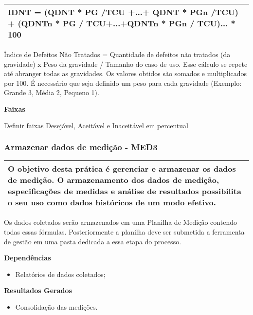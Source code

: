 \begin{table}[!ht]
\centering
\begin{tabular}{|p{130mm}|}
\hline
IDNT = (QDNT * PG /TCU +...+ QDNT * PGn /TCU) + (QDNTn * PG / TCU+...+QDNTn * PGn / TCU)... * 100 \\ 
\hline
\end{tabular}
\end{table}

Índice de Defeitos Não Tratados = Quantidade de defeitos não tratados (da gravidade) x Peso da gravidade / Tamanho do caso de uso. Esse cálculo se repete até abranger todas as gravidades. Os valores obtidos são somados e multiplicados por 100. É necessário que seja definido um peso para cada gravidade (Exemplo: Grande 3, Média 2, Pequeno 1).

\textbf{Faixas}

Definir faixas Desejável, Aceitável e Inaceitável em percentual

\subsubsection{Armazenar dados de medição - MED3 }
\label{sec:med3}

\begin{table}[!ht]
\centering
\begin{tabular}{|p{130mm}|}
\hline
O objetivo desta prática é gerenciar e armazenar os dados de medição. O armazenamento dos dados de medição, especificações de medidas e análise de resultados possibilita o seu uso como dados históricos de um modo efetivo. \\ 
\hline
\end{tabular}
\end{table}

Os dados coletados serão armazenados em uma Planilha de Medição contendo todas essas fórmulas. Posteriormente a planilha deve ser submetida a ferramenta de gestão em uma pasta dedicada a essa etapa do processo.

\textbf{Dependências}

\begin{itemize}
\item Relatórios de dados coletados;
\end{itemize}

\textbf{ Resultados Gerados }
\begin{itemize}
\item Consolidação das medições.
\end{itemize}


